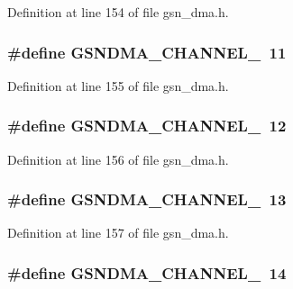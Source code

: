 Definition at line 154 of file gsn\_\-dma.h.

\hypertarget{a00484_a000b4af780c11b29b0010f675e3cbc60}{
\subsubsection[{GSNDMA\_\-CHANNEL\_\-11}]{\setlength{\rightskip}{0pt plus 5cm}\#define GSNDMA\_\-CHANNEL\_~11}}
\label{a00484_a000b4af780c11b29b0010f675e3cbc60}


Definition at line 155 of file gsn\_\-dma.h.

\hypertarget{a00484_ad0ad6437e0dd4308a5ca860908308136}{
\subsubsection[{GSNDMA\_\-CHANNEL\_\-12}]{\setlength{\rightskip}{0pt plus 5cm}\#define GSNDMA\_\-CHANNEL\_~12}}
\label{a00484_ad0ad6437e0dd4308a5ca860908308136}


Definition at line 156 of file gsn\_\-dma.h.

\hypertarget{a00484_a8a6f986b828460b28e9c9cc6ce0c7885}{
\subsubsection[{GSNDMA\_\-CHANNEL\_\-13}]{\setlength{\rightskip}{0pt plus 5cm}\#define GSNDMA\_\-CHANNEL\_~13}}
\label{a00484_a8a6f986b828460b28e9c9cc6ce0c7885}


Definition at line 157 of file gsn\_\-dma.h.

\hypertarget{a00484_adb6390cb7cc7ceb1567ac4caf1260ba9}{
\subsubsection[{GSNDMA\_\-CHANNEL\_\-14}]{\setlength{\rightskip}{0pt plus 5cm}\#define GSNDMA\_\-CHANNEL\_~14}}
\label{a00484_adb6390cb7cc7ceb1567ac4caf1260ba9}


